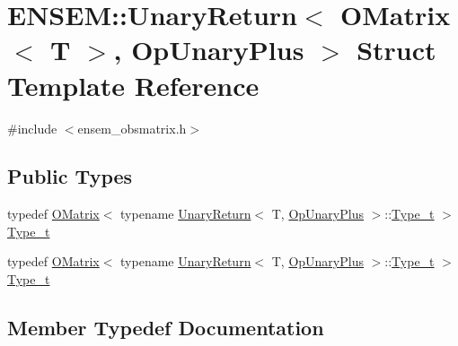 \hypertarget{structENSEM_1_1UnaryReturn_3_01OMatrix_3_01T_01_4_00_01OpUnaryPlus_01_4}{}\section{E\+N\+S\+EM\+:\+:Unary\+Return$<$ O\+Matrix$<$ T $>$, Op\+Unary\+Plus $>$ Struct Template Reference}
\label{structENSEM_1_1UnaryReturn_3_01OMatrix_3_01T_01_4_00_01OpUnaryPlus_01_4}


{\ttfamily \#include $<$ensem\+\_\+obsmatrix.\+h$>$}

\subsection*{Public Types}
\begin{DoxyCompactItemize}
\item 
typedef \mbox{\hyperlink{classENSEM_1_1OMatrix}{O\+Matrix}}$<$ typename \mbox{\hyperlink{structENSEM_1_1UnaryReturn}{Unary\+Return}}$<$ T, \mbox{\hyperlink{structENSEM_1_1OpUnaryPlus}{Op\+Unary\+Plus}} $>$\+::\mbox{\hyperlink{structENSEM_1_1UnaryReturn_3_01OMatrix_3_01T_01_4_00_01OpUnaryPlus_01_4_a2ba28aeb9736737902accf36b7c69fa1}{Type\+\_\+t}} $>$ \mbox{\hyperlink{structENSEM_1_1UnaryReturn_3_01OMatrix_3_01T_01_4_00_01OpUnaryPlus_01_4_a2ba28aeb9736737902accf36b7c69fa1}{Type\+\_\+t}}
\item 
typedef \mbox{\hyperlink{classENSEM_1_1OMatrix}{O\+Matrix}}$<$ typename \mbox{\hyperlink{structENSEM_1_1UnaryReturn}{Unary\+Return}}$<$ T, \mbox{\hyperlink{structENSEM_1_1OpUnaryPlus}{Op\+Unary\+Plus}} $>$\+::\mbox{\hyperlink{structENSEM_1_1UnaryReturn_3_01OMatrix_3_01T_01_4_00_01OpUnaryPlus_01_4_a2ba28aeb9736737902accf36b7c69fa1}{Type\+\_\+t}} $>$ \mbox{\hyperlink{structENSEM_1_1UnaryReturn_3_01OMatrix_3_01T_01_4_00_01OpUnaryPlus_01_4_a2ba28aeb9736737902accf36b7c69fa1}{Type\+\_\+t}}
\end{DoxyCompactItemize}


\subsection{Member Typedef Documentation}
\mbox{\label{structENSEM_1_1UnaryReturn_3_01OMatrix_3_01T_01_4_00_01OpUnaryPlus_01_4_a2ba28aeb9736737902accf36b7c69fa1}} 

